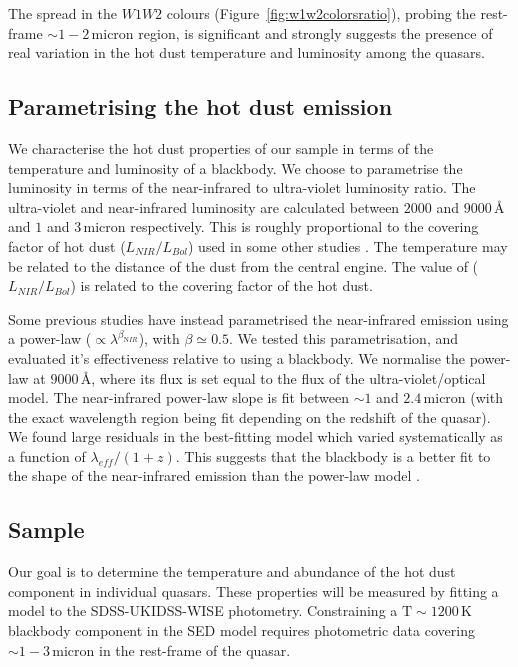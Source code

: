 The spread in the $W1W2$ colours (Figure~\ref{fig:w1w2colorsratio}), probing the rest-frame $\sim1-2$\,micron region, is significant and strongly suggests the presence of real variation in the hot dust temperature and luminosity among the quasars. 

\subsection{Parametrising the hot dust emission}

We characterise the hot dust properties of our sample in terms of the temperature and luminosity of a blackbody.  
We choose to parametrise the luminosity in terms of the near-infrared to ultra-violet luminosity ratio. 
The ultra-violet and near-infrared luminosity are calculated between $2000$ and $9000$\,\AA\, and $1$ and $3$\,micron respectively.
This is roughly proportional to the covering factor of hot dust ($L_{NIR}/L_{Bol}$) used in some other studies \citep[e.g.][]{roseboom13}. 
The temperature may be related to the distance of the dust from the central engine. 
The value of ($L_{NIR}/L_{Bol}$) is related to the covering factor of the hot dust. 

Some previous studies \citep[e.g.][]{wang13,zhang14} have instead parametrised the near-infrared emission using a power-law ($\propto \lambda^{\beta_{\mathrm NIR}}$), with $\beta \simeq 0.5$. 
We tested this parametrisation, and evaluated it's effectiveness relative to using a blackbody. 
We normalise the power-law at $9000$\,\AA, where its flux is set equal to the flux of the ultra-violet/optical model. 
The near-infrared power-law slope is fit between $\sim1$ and $2.4$\,micron (with the exact wavelength region being fit depending on the redshift of the quasar). 
We found large residuals in the best-fitting model which varied systematically as a function of $\lambda_{eff}/(1+z)$.  
This suggests that the blackbody is a better fit to the shape of the near-infrared emission than the power-law model \citep[e.g.][]{gallagher07}. 


\subsection{Sample}

Our goal is to determine the temperature and abundance of the hot dust component in individual quasars.  
These properties will be measured by fitting a model to the SDSS-UKIDSS-WISE photometry. 
Constraining a ${\mathrm T}\sim1200$\,K blackbody component in the SED model requires photometric data covering $\sim1-3$\,micron in the rest-frame of the quasar. 

